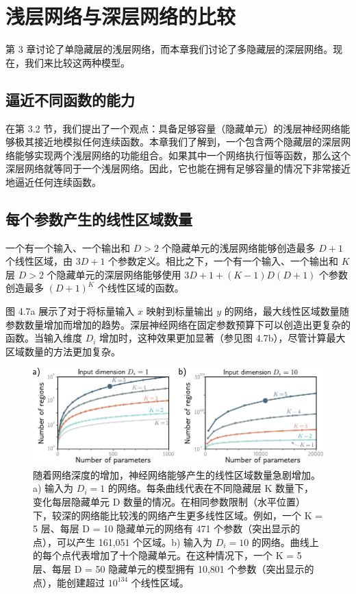 \documentclass[lang=cn,newtx,10pt,scheme=chinese]{elegantbook}
\begin{document}
\section{浅层网络与深层网络的比较}
第 3 章讨论了单隐藏层的浅层网络，而本章我们讨论了多隐藏层的深层网络。现在，我们来比较这两种模型。

\subsection{逼近不同函数的能力}
在第 3.2 节，我们提出了一个观点：具备足够容量（隐藏单元）的浅层神经网络能够极其接近地模拟任何连续函数。本章我们了解到，一个包含两个隐藏层的深层网络能够实现两个浅层网络的功能组合。如果其中一个网络执行恒等函数，那么这个深层网络就等同于一个浅层网络。因此，它也能在拥有足够容量的情况下非常接近地逼近任何连续函数。

\subsection{每个参数产生的线性区域数量}
一个有一个输入、一个输出和 \(D > 2\) 个隐藏单元的浅层网络能够创造最多 \(D + 1\) 个线性区域，由 \(3D + 1\) 个参数定义。相比之下，一个有一个输入、一个输出和 \(K\) 层 \(D > 2\) 个隐藏单元的深层网络能够使用 \(3D + 1 + (K - 1)D(D + 1)\) 个参数创造最多 \((D + 1)^K\) 个线性区域的函数。

图 4.7a 展示了对于将标量输入 \(x\) 映射到标量输出 \(y\) 的网络，最大线性区域数量随参数数量增加而增加的趋势。深层神经网络在固定参数预算下可以创造出更复杂的函数。当输入维度 \(D_i\) 增加时，这种效果更加显著（参见图 4.7b），尽管计算最大区域数量的方法更加复杂。

\begin{figure}[ht!]
	\centering
	\includegraphics[width=0.7\linewidth]{PDFFigures/UDLChap4PDF/DeepParams.pdf}
	\caption{随着网络深度的增加，神经网络能够产生的线性区域数量急剧增加。a) 输入为 \(D_i = 1\) 的网络。每条曲线代表在不同隐藏层 K 数量下，变化每层隐藏单元 D 数量的情况。在相同参数限制（水平位置）下，较深的网络能比较浅的网络产生更多线性区域。例如，一个 K = 5 层、每层 D = 10 隐藏单元的网络有 471 个参数（突出显示的点），可以产生 161,051 个区域。b) 输入为 \(D_i = 10\) 的网络。曲线上的每个点代表增加了十个隐藏单元。在这种情况下，一个 K = 5 层、每层 D = 50 隐藏单元的模型拥有 10,801 个参数（突出显示的点），能创建超过 $10^{134}$ 个线性区域。}
\end{figure}
\end{document}
